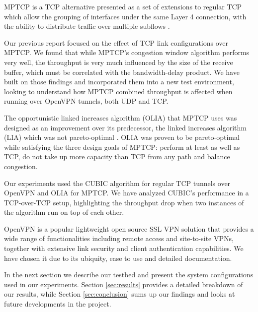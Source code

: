 MPTCP is a TCP alternative  presented as a set of extensions to regular TCP which allow the grouping of interfaces under the same Layer 4 connection, with the ability to distribute traffic over multiple subflows \cite{how-hard-can-it-be}.

Our previous report \cite{sem1} focused on the effect of TCP link configurations over MPTCP. We found that while MPTCP's congestion window algorithm performs very well, the throughput is very much influenced by the size of the receive buffer, which must be correlated with the bandwidth-delay product. We have built on those findings and incorporated them into a new test environment, looking to understand how MPTCP combined throughput is affected when running over OpenVPN tunnels, both UDP and TCP.

The opportunistic linked increases algorithm (OLIA) that MPTCP uses was designed as an improvement over its predecessor, the linked increases algorithm (LIA) which was not pareto-optimal \cite{olia}. OLIA was proven to be pareto-optimal while satisfying the three design goals of MPTCP: perform at least as well as TCP, do not take up more capacity than TCP from any path and balance congestion.

Our experiments used the CUBIC algorithm for regular TCP tunnels over OpenVPN and OLIA for MPTCP. We have analyzed CUBIC's performance in a TCP-over-TCP setup, highlighting the throughput drop when two instances of the algorithm run on top of each other.

OpenVPN is a popular lightweight open source SSL VPN solution that provides a wide range of functionalities including remote access and site-to-site VPNs, together with extensive link security and client authentication capabilities. We have chosen it due to its ubiquity, ease to use and detailed documentation.

In the next section we describe our testbed and present the system configurations used in our experiments.  Section \ref{sec:results} provides a detailed breakdown of our results, while Section \ref{sec:conclusion} sums up our findings and looks at future developments in the project.